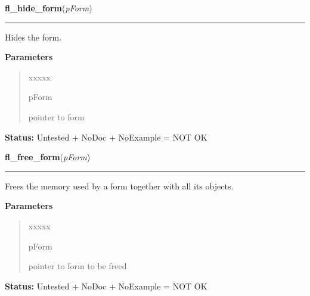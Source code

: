 \hspace{.8\funcindent}\begin{boxedminipage}{\funcwidth}

    \raggedright \textbf{fl\_hide\_form}(\textit{pForm})

    \vspace{-1.5ex}

    \rule{\textwidth}{0.5\fboxrule}
\setlength{\parskip}{2ex}
    Hides the form.

\setlength{\parskip}{1ex}
      \textbf{Parameters}
      \vspace{-1ex}

      \begin{quote}
        \begin{Ventry}{xxxxx}

          \item[pForm]

          pointer to form

        \end{Ventry}

      \end{quote}

\textbf{Status:} Untested + NoDoc + NoExample = NOT OK



    \end{boxedminipage}

    \label{xformslib:library:fl_free_form}

    \vspace{0.5ex}

\hspace{.8\funcindent}\begin{boxedminipage}{\funcwidth}

    \raggedright \textbf{fl\_free\_form}(\textit{pForm})

    \vspace{-1.5ex}

    \rule{\textwidth}{0.5\fboxrule}
\setlength{\parskip}{2ex}
    Frees the memory used by a form together with all its objects.

\setlength{\parskip}{1ex}
      \textbf{Parameters}
      \vspace{-1ex}

      \begin{quote}
        \begin{Ventry}{xxxxx}

          \item[pForm]

          pointer to form to be freed

        \end{Ventry}

      \end{quote}

\textbf{Status:} Untested + NoDoc + NoExample = NOT OK



    \end{boxedminipage}

